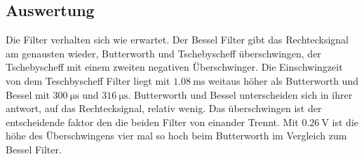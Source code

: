 \subsection{Auswertung}
Die Filter verhalten sich wie erwartet. Der Bessel Filter gibt das Rechtecksignal am genausten wieder, Butterworth und Tschebyscheff überschwingen, der Tschebyscheff mit einem zweiten negativen Überschwinger. Die Einschwingzeit von dem Teschbyscheff Filter liegt mit $\SI{1.08}{\milli\second} $ weitaus höher als Butterworth und Bessel mit $\SI{300}{\micro\second}$ und $\SI{316}{\micro\second}$. %
Butterworth und Bessel unterscheiden sich in ihrer antwort, auf das Rechtecksignal, relativ wenig. Das überschwingen ist der entscheidende faktor den die beiden Filter von einander Trennt. Mit $\SI{0.26}{\volt}$ ist die höhe des Überschwingens vier mal so hoch beim Butterworth im Vergleich zum Bessel Filter.